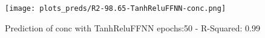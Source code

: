 
\begin{figure}[H]
    \centering
    \texttt{[image: plots\_preds/R2-98.65-TanhReluFFNN-conc.png]}
    \caption{Prediction of conc with TanhReluFFNN epochs:50 - R-Squared: 0.99}
\end{figure}

